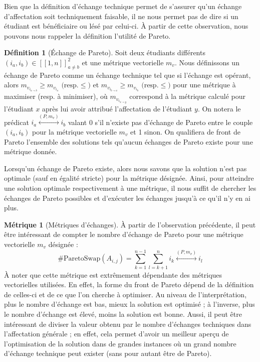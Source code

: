 \documentclass{rapport}
\theoremstyle{definition}
\newtheorem{definition}{Définition}
\theoremstyle{remark}
\theoremstyle{definition}
\newtheorem*{metric}{Métrique}
\theoremstyle{remark}
\begin{document}
Bien que la définition d'échange technique permet de s'assurer qu'un échange d'affectation soit techniquement faisable, il ne nous permet pas de dire si un étudiant est bénéficiaire ou lésé par celui-ci.
À partir de cette observation, nous pouvons nous rappeler la définition l'utilité de Pareto.
\begin{definition}[Échange de Pareto]
    Soit deux étudiants différents $\left(i_a,i_b\right)\in[\![1,n]\!]^2_{a\ne b}$ et une métrique vectorielle $m_v$.
    Nous définissons un échange de Pareto comme un échange technique tel que si l'échange est opérant, alors $m_{v_{i_{a\to b}}} \ge m_{v_{i_a}}\text{ (resp.}\le\text{)}$ et $m_{v_{i_{b\to a}}} \ge m_{v_{i_b}}\text{ (resp.}\le\text{)}$ pour une métrique à maximiser (resp. à minimiser),
    où $m_{v_{i_{x\to y}}}$ correspond à la métrique calculé pour l'étudiant $x$ après lui avoir attribué l'affectation de l'étudiant $y$.
    On notera le prédicat $i_a\stackrel{(P,m_v)}{\longleftrightarrow} i_b$ valant 0 s'il n'existe pas d'échange de Pareto entre le couple $(i_a, i_b)$ pour la métrique vectorielle $m_v$ et 1 sinon.
    On qualifiera de front de Pareto l'ensemble des solutions tels qu'aucun échanges de Pareto existe pour une métrique donnée.
\end{definition}

Lorsqu'un échange de Pareto existe, alors nous savons que la solution n'est pas optimale (sauf en égalité stricte) pour la métrique désignée. Ainsi, pour atteindre une solution optimale respectivement à une métrique, il nous suffit de chercher les échanges de Pareto possibles et d'exécuter les échanges jusqu'à ce qu'il n'y en ai plus.
\begin{metric}[Métriques d'échanges]
    À partir de l'observation précédente, il peut être intéressant de compter le nombre d'échange de Pareto pour une métrique vectorielle $m_v$ désignée :
    $$
        \#\text{ParetoSwap}(A_{i,j}) = \sum_{k=1}^{n-1}\sum_{l=k+1}^{n}i_k\stackrel{(P,m_v)}{\longleftrightarrow}i_l
    $$
    À noter que cette métrique est extrêmement dépendante des métriques vectorielles utilisées. En effet, la forme du front de Pareto dépend de la définition de celles-ci et de ce que l'on cherche à optimiser.
    Au niveau de l'interprétation, plus le nombre d'échange est bas, mieux la solution est optimisé ; à l'inverse, plus le nombre d'échange est élevé, moins la solution est bonne.
    Aussi, il peut être intéressant de diviser la valeur obtenu par le nombre d'échanges techniques dans l'affectation générale ; en effet, cela permet d'avoir un meilleur aperçu de l'optimisation de la solution dans de grandes instances où un grand nombre d'échange technique peut exister (sans pour autant être de Pareto).
\end{metric}
\end{document}
